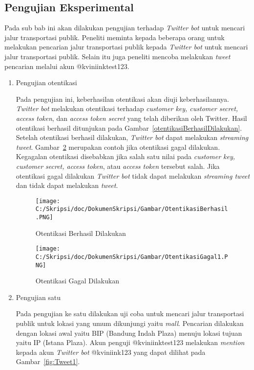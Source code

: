 \subsection{Pengujian Eksperimental}
Pada sub bab ini akan dilakukan pengujian terhadap \textit{Twitter bot} untuk mencari jalur transportasi publik. Peneliti meminta kepada beberapa orang untuk melakukan pencarian jalur transportasi publik kepada \textit{Twitter bot} untuk mencari jalur transportasi publik. Selain itu juga peneliti mencoba melakukan \textit{tweet} pencarian melalui akun @kviniinktest123.

\begin{enumerate}
	\item Pengujian otentikasi
	
	Pada pengujian ini, keberhasilan otentikasi akan diuji keberhasilannya. \textit{Twitter bot} melakukan otentikasi terhadap \textit{customer key, customer secret, access token}, dan \textit{access token secret} yang telah diberikan oleh Twitter. Hasil otentikasi berhasil ditunjukan pada Gambar~\ref{otentikasiBerhasilDilakukan}. Setelah otentikasi berhasil dilakukan, \textit{Twitter bot} dapat melakukan \textit{streaming tweet}. Gambar~\ref{fig:otentikasiGagalDilakukan} merupakan contoh jika otentikasi gagal dilakukan. Kegagalan otentikasi disebabkan jika salah satu nilai pada \textit{customer key, customer secret, access token}, atau \textit{access token} tersebut salah. Jika otentikasi gagal dilakukan \textit{Twitter bot} tidak dapat melakukan \textit{streaming tweet} dan tidak dapat melakukan \textit{tweet}.
	\begin{figure}
		\centering
			\texttt{[image: C:/Skripsi/doc/DokumenSkripsi/Gambar/OtentikasiBerhasil.PNG]}
		\caption{Otentikasi Berhasil Dilakukan}
		\label{fig:otentikasiBerhasilDilakukan}
	\end{figure}
	
	\begin{figure}
		\centering
			\texttt{[image: C:/Skripsi/doc/DokumenSkripsi/Gambar/OtentikasiGagal1.PNG]}
		\caption{Otentikasi Gagal Dilakukan}
		\label{fig:otentikasiGagalDilakukan}
	\end{figure}
	
	\item Pengujian satu
	
	Pada pengujian ke satu dilakukan uji coba untuk mencari jalur transportasi publik untuk lokasi yang umum dikunjungi yaitu \textit{mall}. Pencarian dilakukan dengan lokasi awal yaitu BIP (Bandung Indah Plaza) menuju lokasi tujuan yaitu IP (Istana Plaza). Akun penguji @kviniinktest123 melakukan \textit{mention} kepada akun \textit{Twitter bot} @kviniink123 yang dapat dilihat pada Gambar~\ref{fig:Tweet1}.
	

\end{enumerate}
